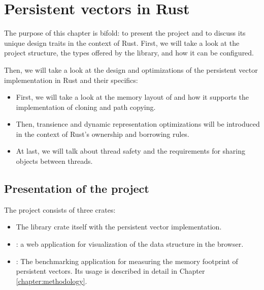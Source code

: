 
\chapter{Persistent vectors in Rust}
\label{chapter:persistent-vectors-in-rust}


The purpose of this chapter is bifold: to present the \pvecrs{} project and to discuss its unique design traits in the context of Rust. First, we will take a look at the project structure, the types offered by the library, and how it can be configured.

Then, we will take a look at the design and optimizations of the persistent vector implementation in Rust and their specifics:

\begin{itemize}
    \item First, we will take a look at the memory layout of \rrbtree{} and how it supports the implementation of cloning and path copying.
    \item Then, transience and dynamic representation optimizations will be introduced in the context of Rust's ownership and borrowing rules.
    \item At last, we will talk about thread safety and the requirements for sharing objects between threads.
\end{itemize}

\section{Presentation of the project}
The \pvecrs{} project consists of three crates:
\begin{itemize}
    \item The library crate itself with the persistent vector implementation.
    \item {}: a web application for visualization of the data structure in the browser.
    \item {}: The benchmarking application for measuring the memory footprint of persistent vectors. Its usage is described in detail in Chapter \ref{chapter:methodology}.
\end{itemize}

